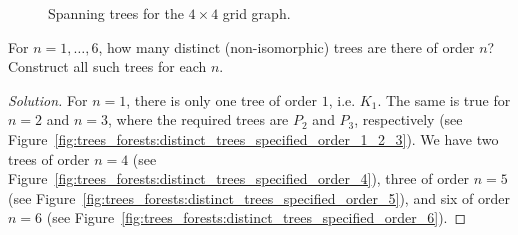 \begin{figure}[!htbp]
\centering
{}
\qquad
{}
\caption{Spanning trees for the $4 \times 4$ grid graph.}
\label{fig:trees_forests:grid_graph_spanning_trees}
\end{figure}

\begin{example}
For $n = 1, \dots, 6$, how many distinct (non-isomorphic) trees are
there of order $n$? Construct all such trees for each $n$.
\end{example}

\begin{proof}[Solution]
For $n = 1$, there is only one tree of order $1$, i.e. $K_1$. The same
is true for $n = 2$ and $n = 3$, where the required trees are $P_2$
and $P_3$, respectively (see
Figure~\ref{fig:trees_forests:distinct_trees_specified_order_1_2_3}). We
have two trees of order $n = 4$ (see
Figure~\ref{fig:trees_forests:distinct_trees_specified_order_4}),
three of order $n = 5$ (see
Figure~\ref{fig:trees_forests:distinct_trees_specified_order_5}), and
six of order $n = 6$ (see
Figure~\ref{fig:trees_forests:distinct_trees_specified_order_6}).
\end{proof}

